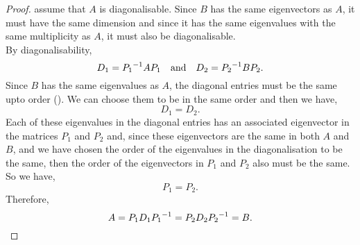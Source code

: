 \documentclass[../MathsNotesBase.tex]{subfiles}
\begin{document}
{ 	
 		\bigskip
 		\begin{proof}
 			\WLOG assume that $A$ is diagonalisable. Since $B$ has the same eigenvectors as $A$, it must have the same dimension and since it has the same eigenvalues with the same multiplicity as $A$, it must also be diagonalisable.\\
 			
 			By diagonalisability,
 			\[ D_1 = {P_1}^{-1} A P_1 \hspace{10pt}\text{and}\hspace{10pt} D_2 = {P_2}^{-1} B P_2. \]
 			Since $B$ has the same eigenvalues as $A$, the diagonal entries must be the same upto order (\addref). We can choose them to be in the same order and then we have,
 			\[ D_1 = D_2. \]
 			Each of these eigenvalues in the diagonal entries has an associated eigenvector in the matrices $P_1$ and $P_2$ and, since these eigenvectors are the same in both $A$ and $B$, and we have chosen the order of the eigenvalues in the diagonalisation to be the same, then the order of the eigenvectors in $P_1$ and $P_2$ also must be the same. So we have,
 			\[ P_1 = P_2. \]
 			Therefore,
 			\[ A = P_1 D_1 {P_1}^{-1} = P_2 D_2 {P_2}^{-1} = B. \]	
 		\end{proof}
 	
}
\end{document}
